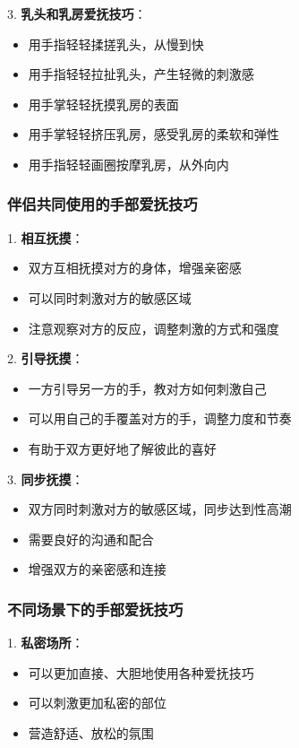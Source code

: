 \documentclass[12pt,UTF8]{ctexbook}
\begin{document}
3. \textbf{乳头和乳房爱抚技巧}：
  \begin{itemize}
  \item 用手指轻轻揉搓乳头，从慢到快
  \item 用手指轻轻拉扯乳头，产生轻微的刺激感
  \item 用手掌轻轻抚摸乳房的表面
  \item 用手掌轻轻挤压乳房，感受乳房的柔软和弹性
  \item 用手指轻轻画圈按摩乳房，从外向内
  \end{itemize}

\subsubsection{伴侣共同使用的手部爱抚技巧}

1. \textbf{相互抚摸}：
  \begin{itemize}
  \item 双方互相抚摸对方的身体，增强亲密感
  \item 可以同时刺激对方的敏感区域
  \item 注意观察对方的反应，调整刺激的方式和强度
  \end{itemize}

2. \textbf{引导抚摸}：
  \begin{itemize}
  \item 一方引导另一方的手，教对方如何刺激自己
  \item 可以用自己的手覆盖对方的手，调整力度和节奏
  \item 有助于双方更好地了解彼此的喜好
  \end{itemize}

3. \textbf{同步抚摸}：
  \begin{itemize}
  \item 双方同时刺激对方的敏感区域，同步达到性高潮
  \item 需要良好的沟通和配合
  \item 增强双方的亲密感和连接
  \end{itemize}

\subsubsection{不同场景下的手部爱抚技巧}

1. \textbf{私密场所}：
  \begin{itemize}
  \item 可以更加直接、大胆地使用各种爱抚技巧
  \item 可以刺激更加私密的部位
  \item 营造舒适、放松的氛围
  \end{itemize}
\end{document}
